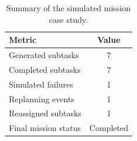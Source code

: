 \begin{table}[htbp]
\centering
\caption{Summary of the simulated mission case study.}
\label{tab:simulation_case_summary}
\begin{tabular}{lc}
\toprule
Metric & Value \\
\midrule
Generated subtasks & 7 \\
Completed subtasks & 7 \\
Simulated failures & 1 \\
Replanning events & 1 \\
Reassigned subtasks & 1 \\
Final mission status & Completed \\
\bottomrule
\end{tabular}
\end{table}